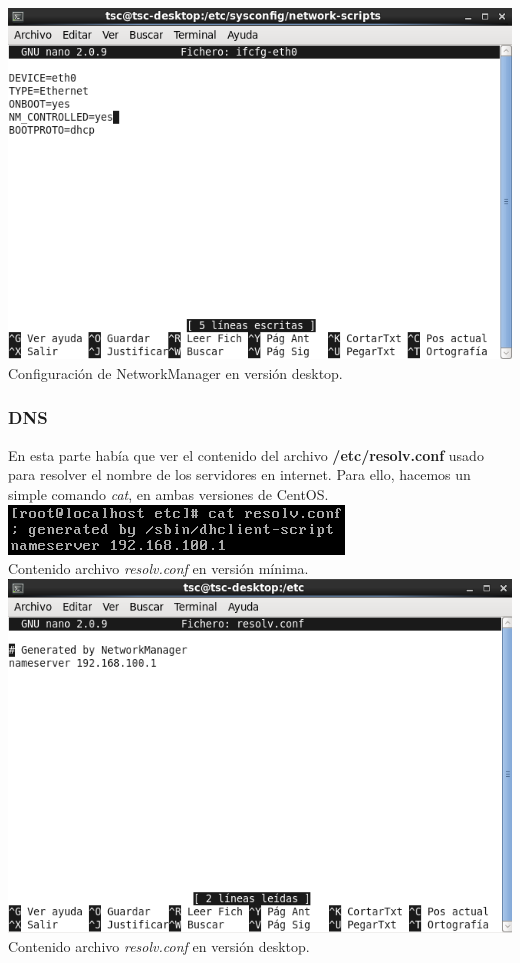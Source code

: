 \documentclass[11pt]{article}
\begin{document}
\includegraphics[width=.75\linewidth]{screenshots/desktop/ifcfg-eth0.png}
    \\Configuración de NetworkManager en versión desktop.\\
\newpage
\subsubsection{DNS}
	En esta parte había que ver el contenido del archivo \textbf{/etc/resolv.conf} usado para resolver el nombre de los servidores en internet. Para ello, hacemos un simple comando \textit{cat}, en ambas versiones de CentOS.\\
	
\includegraphics[width=.45\linewidth]{screenshots/minimal/cat-resolv-conf.png}
    \\Contenido archivo \textit{resolv.conf} en versión mínima.\\

\includegraphics[width=.75\linewidth]{screenshots/desktop/resolv-conf.png}
    \\Contenido archivo \textit{resolv.conf} en versión desktop.
\newpage
\end{document}
